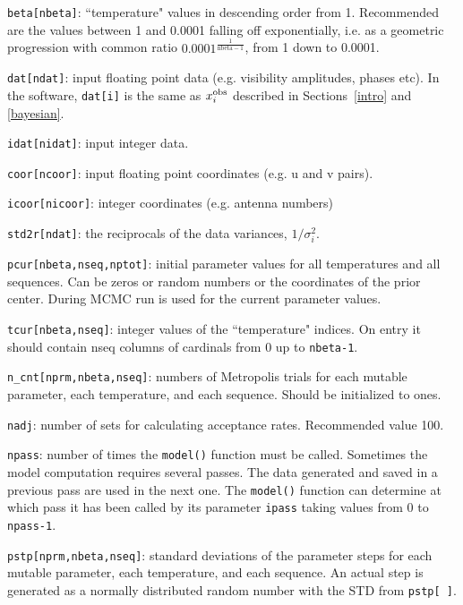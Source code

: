\documentclass[preprint2]{aastex}
\begin{document}
\verb|beta[nbeta]|: ``temperature" values in descending order from 1. Recommended are
             the values between 1 and 0.0001 falling off exponentially, i.e. as a geometric progression
	         with common ratio $0.0001^\frac{1}{\mathrm{nbeta-1}}$, from 1 down to 0.0001.

\verb|dat[ndat]|: input floating point data (e.g. visibility amplitudes, phases etc). 
				  In the software, \verb|dat[i]| is the same as $x^{\rm obs}_i$ described
				  in Sections~\ref{intro} and \ref{bayesian}.

\verb|idat[nidat]|: input integer data.

\verb|coor[ncoor]|: input floating point coordinates (e.g. u and v pairs).

\verb|icoor[nicoor]|: integer coordinates (e.g. antenna numbers)
             
\verb|std2r[ndat]|: the reciprocals of the data variances, $1/\sigma^2_i$.

\verb|pcur[nbeta,nseq,nptot]|: initial parameter values for all temperatures and
                        all sequences. Can be zeros or random numbers or
                        the coordinates of the prior center. During MCMC
                        run is used for the current parameter values.

\verb|tcur[nbeta,nseq]|: integer values of the ``temperature" indices. On entry it
                  should contain nseq columns of cardinals from 0 up to
                  \verb|nbeta-1|.

\verb|n_cnt[nprm,nbeta,nseq]|: numbers of Metropolis trials for each mutable
                        parameter, each temperature, and each sequence.
                        Should be initialized to ones.

\verb|nadj|: number of sets for calculating acceptance rates. Recommended value 100.

\verb|npass|: number of times the \verb|model()| function must be called. Sometimes
       the model computation requires several passes. The data generated and saved in a
       previous pass are used in the next one. The \verb|model()| function
       can determine at which pass it has been called by its parameter \verb|ipass|
       taking values from 0 to \verb|npass-1|.

\verb|pstp[nprm,nbeta,nseq]|: standard deviations of the parameter steps for each mutable parameter,
                       each temperature, and each sequence. An actual step is generated as a normally
                       distributed random number with the STD from \verb|pstp[ ]|.
                       
\end{document}
